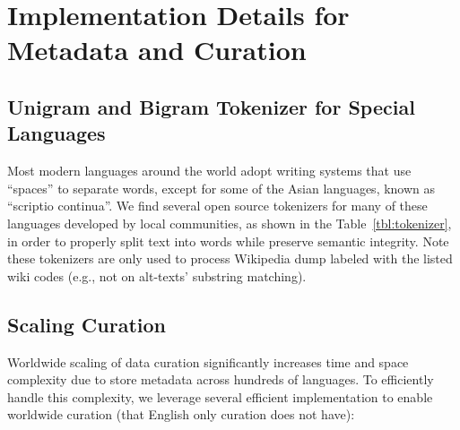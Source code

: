 \section{Implementation Details for Metadata and Curation} 
\label{appx:details}

\subsection{Unigram and Bigram Tokenizer for Special Languages}
\label{appx:tokenizers}

Most modern languages around the world adopt writing systems that use ``spaces'' to separate words, except for some of the Asian languages, known as ``scriptio continua''\citep{scriptio_continua}. We find several open source tokenizers for many of these languages developed by local communities, as shown in the Table~\ref{tbl:tokenizer}, in order to properly split text into words while preserve semantic integrity. Note these tokenizers are only used to process Wikipedia dump labeled with the listed wiki codes (e.g., not on alt-texts' substring matching).

\begin{table}[h]
\centering
{}
\vspace{1.5mm}
\caption{Tokenizers for special languages.}
\label{tbl:tokenizer}
\end{table}

\subsection{Scaling Curation} 
\label{sec:impl_curation}
Worldwide scaling of data curation significantly increases time and space complexity due to store metadata across hundreds of languages. To efficiently handle this complexity, we leverage several efficient implementation to enable worldwide curation (that English only curation does not have):

